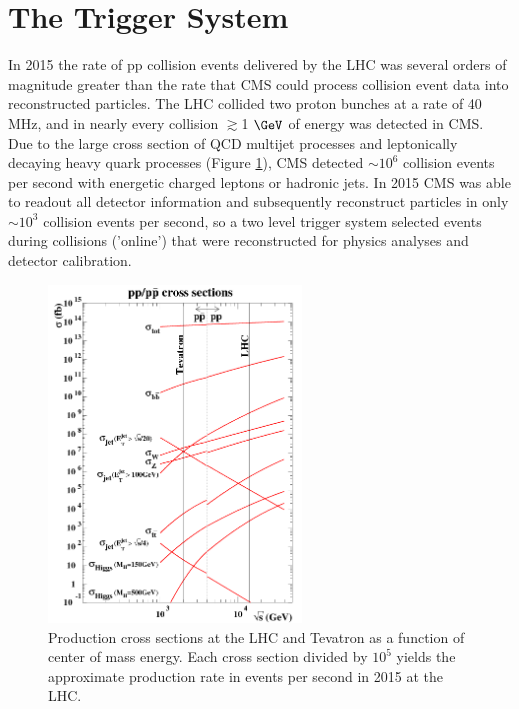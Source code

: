 \section{The Trigger System}
\label{sec:triggerDescription}
In 2015 the rate of pp collision events delivered by the LHC was several orders of magnitude greater than the 
rate that CMS could process collision event data into reconstructed particles.  The LHC collided two proton bunches 
at a rate of 40 MHz, and in nearly every collision $\gtrsim$1 $\GeV$ of energy was detected in CMS.  Due to the large cross 
section of QCD multijet processes and leptonically decaying heavy quark processes (Figure \ref{fig:smProductionXsxns}), CMS 
detected $\sim10^{6}$ collision events per second with energetic charged leptons or hadronic jets.  In 2015 
CMS was able to readout all detector information and subsequently reconstruct particles in only $\sim10^{3}$ 
collision events per second, so a two level trigger 
system selected events during collisions ('online') that were reconstructed for physics analyses and detector calibration.

\begin{figure}[h]
	\centering
	\includegraphics[width=0.6\textwidth]{figures/lhc_and_tevatron_cross_sections_2006.png}
	\caption{Production cross sections at the LHC and Tevatron as a function of center of mass energy.  Each cross section divided by $10^{5}$ yields 
	the approximate production rate in events per second in 2015 at the LHC.}
	\label{fig:smProductionXsxns}
\end{figure}

